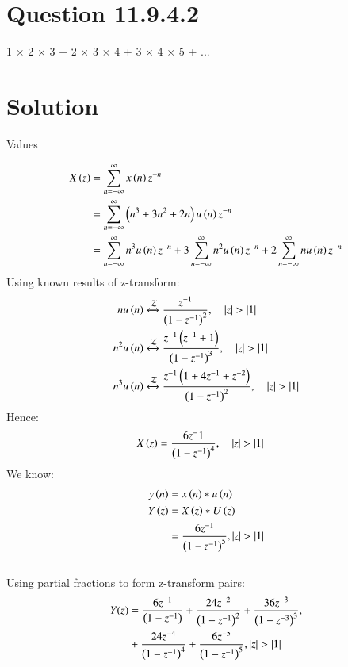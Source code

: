 \documentclass[journal,12pt,twocolumn]{IEEEtran}
\theoremstyle{remark}
\begin{document}
\section{Question 11.9.4.2}
1 $\times$ 2 $\times$  3 + 2 $\times$ 3 $\times$ 4 + 3 $\times$ 4 $\times$ 5 + ...
\section{Solution}
\fi
\begin{table}[!h]
    \centering
     \vspace{0.5cm}
    \caption{Values} 
    \label{tab:mytable}
\end{table}
\begin{align}
 X\left(z\right) &= \sum_{n=-\infty}^\infty x \left(n\right)  z^{-n}\\
  &= \sum_{n=-\infty}^\infty \left(n^{3} + 3n^{2} + 2n\right) u\left(n\right) z^{-n}\\
  &= \sum_{n=-\infty}^\infty n^{3} u \left(n\right) z^{-n} + 3 \sum_{n=-\infty}^\infty n^{2} u \left(n\right) z^{-n}+ 2\sum_{n=-\infty}^\infty n u \left(n\right) z^{-n}
 \end{align}
 Using known results of z-transform:
 \begin{align}
 n u \left(n\right) &\xleftrightarrow[]{\mathcal{Z}} \frac{z^{-1}}{\left(1- z^{-1}\right)^2}, \quad \left\vert z\right\vert > \left\vert1\right\vert\\
 n^2 u \left(n\right) &\xleftrightarrow[]{\mathcal{Z}} \frac{z^{-1} \left(z^{-1} + 1\right)}{\left(1- z^{-1}\right)^3}, \quad \left\vert z\right\vert > \left\vert1\right\vert \\
 n^3 u \left(n\right) &\xleftrightarrow[]{\mathcal{Z}} \frac{z^{-1} \left(1 + 4z^{-1} + z^{-2}\right) }{\left(1- z^{-1}\right)^2}, \quad \left\vert z\right\vert > \left\vert1\right\vert
 \end{align}
 Hence:
 \begin{align}
 X\left(z\right)&= \frac{6z^-1}{\left(1-z^{-1}\right)^4} , \quad \left\vert z\right\vert > \left\vert1\right\vert
 \end{align}
We know:
\begin{align}
y\left(n\right) &= x\left(n\right)\ast u\left(n\right)\\
    Y\left(z\right) &= X\left(z\right) \ast U\left(z\right) \\
 &= \frac{6z^{-1}}{\left(1-z^{-1}\right)^5} , \left\vert z\right\vert> \left\vert1\right\vert 
\end{align}
\\
Using partial fractions to form z-transform pairs:
\\
\begin{align}
Y(z) &= \frac{6z^{-1}}{\left(1-z^{-1}\right)} + \frac{24z^{-2}}{\left(1-z^{-1}\right)^2} + \frac{36z^{-3}}{\left(1-z^{-3}\right)^3} , \\
    &+ \frac{24z^{-4}}{\left(1-z^{-1}\right)^4}+\frac{6z^{-5}}{\left(1-z^{-1}\right)^5} , \left\vert z\right\vert>\left\vert1\right\vert 
\end{align}
\end{document}
